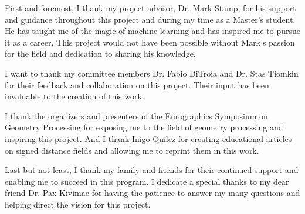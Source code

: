 
First and foremost, I thank my project advisor, Dr. Mark Stamp, for his support and guidance throughout this project and during my time as a Master's student. He has taught me of the magic of machine learning and has inspired me to pursue it as a career. This project would not have been possible without Mark's passion for the field and dedication to sharing his knowledge.

I want to thank my committee members Dr. Fabio DiTroia and Dr. Stas Tiomkin for their feedback and collaboration on this project. Their input has been invaluable to the creation of this work.

I thank the organizers and presenters of the Eurographics Symposium on Geometry Processing for exposing me to the field of geometry processing and inspiring this project. And I thank Inigo Quilez for creating educational articles on signed distance fields and allowing me to reprint them in this work.

Last but not least, I thank my family and friends for their continued support and enabling me to succeed in this program. I dedicate a special thanks to my dear friend Dr. Pax Kivimae for having the patience to answer my many questions and helping direct the vision for this project.